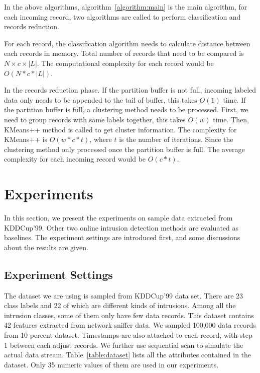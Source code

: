 \documentclass[runningheads]{llncs}
\begin{document}
	In the above algorithms, algorithm~\ref{algorithm:main} is the main algorithm, for each incoming record, two algorithms are called to perform classification and records reduction.
	
	For each record, the classification algorithm needs to calculate distance between each records in memory. Total number of records that need to be compared is $N \times c \times |L|$. The computational complexity for each record would be $O(N*c*|L|)$.
	
	In the records reduction phase. If the partition buffer is not full, incoming labeled data only needs to be appended to the tail of buffer, this takes $O(1)$ time. If the partition buffer is full, a clustering method needs to be processed. First, we need to group records with same labels together, this takes $O(w)$ time. Then, KMeans++ method is called to get cluster information. The complexity for KMeans++ is $O(w*c*t)$, where $t$ is the number of iterations. Since the clustering method only processed once the partition buffer is full. The average complexity for each incoming record would be $O(c*t)$.
	
	\section{Experiments} \label{Experiments}
	In this section, we present the experiments on sample data extracted from KDDCup'99. Other two online intrusion detection methods are evaluated as baselines. The experiment settings are introduced first, and some discussions about the results are given.
	
	\subsection{Experiment Settings}
	
	The dataset we are using is sampled from KDDCup'99 data set. There are 23 class labels and 22 of which are different kinds of intrusions. Among all the intrusion classes, some of them only have few data records. This dataset contains 42 features extracted from network sniffer data. We sampled 100,000 data records from 10 percent dataset. Timestamps are also attached to each record, with step 1 between each adjust records. We further use sequential scan to simulate the actual data stream. Table~\ref{table:dataset} lists all the attributes contained in the dataset. Only 35 numeric values of them are used in our experiments.
	
\end{document}
